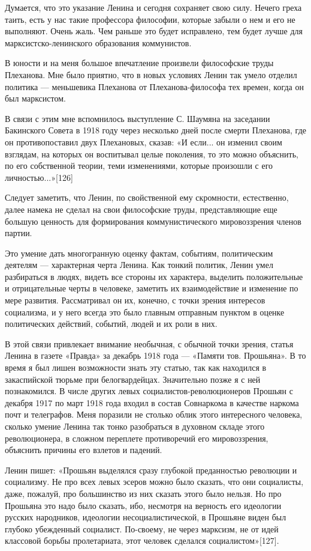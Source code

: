 \documentclass[12pt, a4paper, openany]{book}
\begin{document}
Думается, что это указание Ленина и сегодня сохраняет свою силу. Нечего греха таить, есть у нас такие профессора философии, которые забыли о нем и его не выполняют. Очень жаль. Чем раньше это будет исправлено, тем будет лучше для марксистско-ленинского образования коммунистов.

В юности и на меня большое впечатление произвели философские труды Плеханова. Мне было приятно, что в новых условиях Ленин так умело отделил политика — меньшевика Плеханова от Плеханова-философа тех времен, когда он был марксистом.

В связи с этим мне вспомнилось выступление С. Шаумяна на заседании Бакинского Совета в 1918 году через несколько дней после смерти Плеханова, где он противопоставил двух Плехановых, сказав: «И если... он изменил своим взглядам, на которых он воспитывал целые поколения, то это можно объяснить, по его собственной теории, теми изменениями, которые произошли с его личностью...»[126]

Следует заметить, что Ленин, по свойственной ему скромности, естественно, далее намека не сделал на свои философские труды, представляющие еще большую ценность для формирования коммунистического мировоззрения членов партии.

Это умение дать многогранную оценку фактам, событиям, политическим деятелям — характерная черта Ленина. Как тонкий политик, Ленин умел разбираться в людях, видеть все стороны их характера, выделить положительные и отрицательные черты в человеке, заметить их взаимодействие и изменение по мере развития. Рассматривал он их, конечно, с точки зрения интересов социализма, и у него всегда это было главным отправным пунктом в оценке политических действий, событий, людей и их роли в них.

В этой связи привлекает внимание необычная, с обычной точки зрения, статья Ленина в газете «Правда» за декабрь 1918 года — «Памяти тов. Прошьяна». В то время я был лишен возможности знать эту статью, так как находился в закаспийской тюрьме при белогвардейцах. Значительно позже я с ней познакомился. В числе других левых социалистов-революционеров Прошьян с декабря 1917 по март 1918 года входил в состав Совнаркома в качестве наркома почт и телеграфов. Меня поразили не столько облик этого интересного человека, сколько умение Ленина так тонко разобраться в духовном складе этого революционера, в сложном переплете противоречий его мировоззрения, объяснить причины его взлетов и падений.

Ленин пишет: «Прошьян выделялся сразу глубокой преданностью революции и социализму. Не про всех левых эсеров можно было сказать, что они социалисты, даже, пожалуй, про большинство из них сказать этого было нельзя. Но про Прошьяна это надо было сказать, ибо, несмотря на верность его идеологии русских народников, идеологии несоциалистической, в Прошьяне виден был глубоко убежденный социалист. По-своему, не через марксизм, не от идей классовой борьбы пролетариата, этот человек сделался социалистом»[127].
\end{document}
